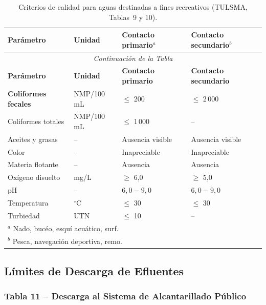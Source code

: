 \documentclass[12pt,a4paper]{article}
\begin{document}
\begin{longtable}{p{5.0cm}p{1.8cm}p{3.5cm}p{3.5cm}}
\caption{Criterios de calidad para aguas destinadas a fines recreativos (TULSMA, Tablas~9 y 10).}\\
\toprule
\textbf{Par\'ametro} & \textbf{Unidad} & \textbf{Contacto primario$^a$} & \textbf{Contacto secundario$^b$} \\
\midrule
\endfirsthead
\multicolumn{4}{c}{\small\itshape Continuaci\'on de la Tabla}\\
\toprule
\textbf{Par\'ametro} & \textbf{Unidad} & \textbf{Contacto primario} & \textbf{Contacto secundario} \\
\midrule
\endhead
\bottomrule
\endlastfoot
\textbf{Coliformes fecales} & NMP/100 mL & $\leq$ 200 & $\leq$ 2\,000 \\
Coliformes totales & NMP/100 mL & $\leq$ 1\,000 & -- \\
Aceites y grasas & -- & Ausencia visible & Ausencia visible \\
Color & -- & Inapreciable & Inapreciable \\
Materia flotante & -- & Ausencia & Ausencia \\
Ox\'igeno disuelto & mg/L & $\geq$ 6,0 & $\geq$ 5,0 \\
pH & -- & $6,0 - 9,0$ & $6,0 - 9,0$ \\
Temperatura & $^\circ$C & $\leq$ 30 & $\leq$ 30 \\
Turbiedad & UTN & $\leq$ 10 & -- \\
\multicolumn{4}{l}{\scriptsize $^a$ Nado, buc\'eo, esqu\'i acu\'atico, surf.} \\
\multicolumn{4}{l}{\scriptsize $^b$ Pesca, navegaci\'on deportiva, remo.} \\
\end{longtable}
\normalsize

\newpage
\subsection{L\'imites de Descarga de Efluentes}

\subsubsection{Tabla 11 -- Descarga al Sistema de Alcantarillado P\'ublico}
\tiny
\end{document}
